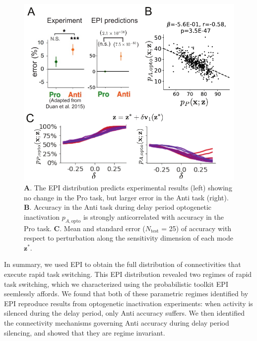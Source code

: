 \documentclass[11pt]{article}
\begin{document}
\begin{figure}
\begin{center}
\includegraphics[scale=0.8]{figures/fig5/fig5.pdf}
\end{center}
\caption{\footnotesize 
\textbf{A}. The EPI distribution predicts experimental results (left) showing no change in the Pro task, but larger error in the Anti task (right).
\textbf{B}. Accuracy in the Anti task during delay period optogenetic inactivation $p_{A,\text{opto}}$ is strongly anticorrelated with accuracy in the Pro task.
\textbf{C}. Mean and standard error ($N_{\text{test}}$ = 25) of accuracy with respect to perturbation along the sensitivity dimension of each mode $\mathbf{z}^*$.
}
\label{fig:SC_opto}
\end{figure}

In summary, we used EPI to obtain the full distribution of connectivities that execute rapid task switching.
This EPI distribution revealed two regimes of rapid task switching, which we characterized using the probabilistic toolkit EPI seemlessly affords.
We found that both of these parametric regimes identified by EPI reproduce results from optogenetic inactivation experiments: when activity is silenced during the delay period, only Anti accuracy suffers.
We then identified the connectivity mechanisms governing Anti accuracy during delay period silencing, and showed that they are regime invariant.
\end{document}
